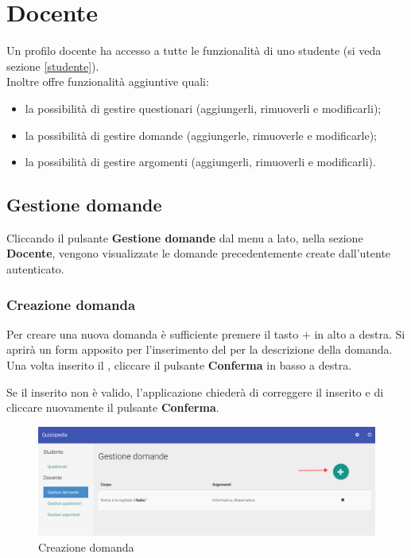 \documentclass[12pt,a4paper]{article}
\begin{document}
	\newpage
	\section{Docente}\label{docente}
	Un profilo docente ha accesso a tutte le funzionalità di uno studente (si veda sezione \ref{studente}). \\
		Inoltre offre funzionalità aggiuntive quali:
		\begin{itemize}
			\item la possibilità di gestire questionari (aggiungerli, rimuoverli e modificarli);
			\item la possibilità di gestire domande (aggiungerle, rimuoverle e modificarle);
			\item la possibilità di gestire argomenti (aggiungerli, rimuoverli e modificarli).
		\end{itemize}
	
    \subsection{Gestione domande}

    Cliccando il pulsante \textbf{Gestione domande} dal menu a lato, nella sezione \textbf{Docente}, vengono visualizzate le domande precedentemente create dall'utente autenticato. 
    
	\subsubsection{Creazione domanda}
	Per creare una nuova domanda è sufficiente premere il tasto $\boldsymbol{+}$ in alto a destra. Si aprirà un form apposito per l'inserimento del  per la descrizione della domanda. Una volta inserito il , cliccare il pulsante \textbf{Conferma} in basso a destra.
	
	Se il  inserito non è valido, l'applicazione chiederà di correggere il  inserito e di cliccare nuovamente il pulsante \textbf{Conferma}.
	
		\begin{figure}[H]	
			\centering
			\includegraphics[width=1\linewidth]{../img/screenshot/creazioneDomanda.png}
			\caption{Creazione domanda}
			\label{Creazione domanda}
		\end{figure}
	
\end{document}
